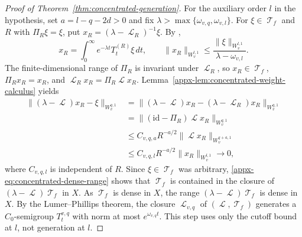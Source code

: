 \documentclass[11pt]{article}
\theoremstyle{myplain}
\theoremstyle{mydefinition}
\theoremstyle{remark}
\DeclareMathOperator{\cL}{\mathcal{L}}
\DeclareMathOperator{\cT}{\mathcal{T}}
\DeclareMathOperator{\1}{\mathds{1}}
\begin{document}
\begin{proof}[Proof of Theorem~\ref{thm:concentrated-generation}]
        For the auxiliary order $l$ in the hypothesis, set $a=l-q-2d>0$ and fix $\lambda>\max\{\omega_{v,q},\omega_{v,l}\}$. For $\xi\in\cT_f$ and $R$ with $\Pi_R\xi=\xi$, put $x_R=(\lambda-\cL_R)^{-1}\xi$. By \cite[Thm.~II.1.10]{Engel.2000},
        \begin{equation}
            x_R=\int_0^\infty e^{-\lambda t}T_t^{(R)}\xi\,dt,
            \qquad
            \|x_R\|_{W_v^{l,1}}\leq\frac{\|\xi\|_{W_v^{l,1}}}{\lambda-\omega_{v,l}}.
        \end{equation}
        The finite-dimensional range of $\Pi_R$ is invariant under $\cL_R$, so $x_R\in\cT_f$, $\Pi_Rx_R=x_R$, and $\cL_Rx_R=\Pi_R\cL x_R$. Lemma~\ref{appx-lem:concentrated-weight-calculus} yields
        \begin{equation}\label{appx-eq:concentrated-dense-range}
            \begin{aligned}
                \|(\lambda-\cL)x_R-\xi\|_{W_v^{q,1}}
                &=\|(\lambda-\cL)x_R-(\lambda-\cL_R)x_R\|_{W_v^{q,1}}\\
                &=\|(\mathrm{id}-\Pi_R)\cL x_R\|_{W_v^{q,1}}\\
                &\leq C_{v,q,a} R^{-a/2} \|\cL x_R\|_{W_v^{q+a,1}}\\
                &\leq C_{v,q,l}R^{-a/2}\|x_R\|_{W_v^{l,1}}
                \longrightarrow0,
            \end{aligned}
        \end{equation}
        where $C_{v,q,l}$ is independent of $R$. Since $\xi\in\cT_f$ was arbitrary, \eqref{appx-eq:concentrated-dense-range} shows that $\cT_f$ is contained in the closure of $(\lambda-\cL)\cT_f$ in $X$. As $\cT_f$ is dense in $X$, the range $(\lambda-\cL)\cT_f$ is dense in $X$. By the Lumer--Phillips theorem, the closure $\cL_{v,q}$ of $(\cL,\cT_f)$ generates a $C_0$-semigroup $T_t^{v,q}$ with norm at most $e^{\omega_{v,q}t}$. This step uses only the cutoff bound at $l$, not generation at $l$.


\end{proof}
\end{document}
